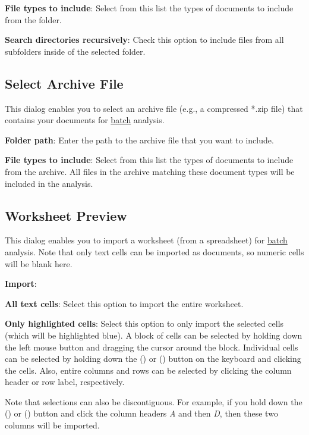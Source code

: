 \documentclass[
]{book}
\theoremstyle{definition}
\theoremstyle{definition}
\theoremstyle{definition}
\theoremstyle{definition}
\theoremstyle{remark}
\begin{document}
\textbf{File types to include}: Select from this list the types of documents to include from the folder.

\textbf{Search directories recursively}: Check this option to include files from all subfolders inside of the selected folder.

\hypertarget{select-archive}{%
\subsection*{Select Archive File}\label{select-archive}}

This dialog enables you to select an archive file (e.g., a compressed *.zip file) that contains your documents for \protect\hyperlink{creating-batch-project}{batch} analysis.

\textbf{Folder path}: Enter the path to the archive file that you want to include.

\textbf{File types to include}: Select from this list the types of documents to include from the archive. All files in the archive matching these document types will be included in the analysis.

\hypertarget{worksheet-preview}{%
\subsection*{Worksheet Preview}\label{worksheet-preview}}

This dialog enables you to import a worksheet (from a spreadsheet) for \protect\hyperlink{creating-batch-project}{batch} analysis. Note that only text cells can be imported as documents, so numeric cells will be blank here.

\textbf{Import}:

\textbf{All text cells}: Select this option to import the entire worksheet.

\textbf{Only highlighted cells}: Select this option to only import the selected cells (which will be highlighted blue). A block of cells can be selected by holding down the left mouse button and dragging the cursor around the block. Individual cells can be selected by holding down the  (\faWindows) or \keys{\cmd} (\faApple) button on the keyboard and clicking the cells. Also, entire columns and rows can be selected by clicking the column header or row label, respectively.

Note that selections can also be discontiguous. For example, if you hold down the  (\faWindows) or \keys{\cmd} (\faApple) button and click the column headers \emph{A} and then \emph{D}, then these two columns will be imported.
\end{document}
